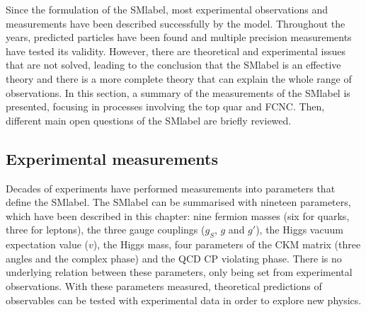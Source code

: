 Since the formulation of the \acrshort{SMlabel}, most experimental observations and measurements have been described successfully by the model. Throughout the years, predicted particles have been found and multiple precision measurements have tested its validity. However, there are theoretical and experimental issues that are not solved, leading to the conclusion that the \acrshort{SMlabel} is an effective theory and there is a more complete theory that can explain the whole range of observations. In this section, a summary of the measurements of the \acrshort{SMlabel} is presented, focusing in processes involving the top quar and FCNC. Then, different main open questions of the \acrshort{SMlabel} are briefly reviewed.

\subsection{Experimental measurements}

Decades of experiments have performed measurements into parameters that define the \acrshort{SMlabel}. The \acrshort{SMlabel} can be summarised with nineteen parameters, which have been described in this chapter: nine fermion masses (six for quarks, three for leptons), the three gauge couplings ($g_S$, $g$ and $g'$), the Higgs vacuum expectation value ($v$), the Higgs mass, four parameters of the CKM matrix (three angles and the complex phase) and the \acrshort{QCD} CP violating phase. There is no underlying relation between these parameters, only being set from experimental observations. With these parameters measured, theoretical predictions of observables can be tested with experimental data in order to explore new physics.\\

